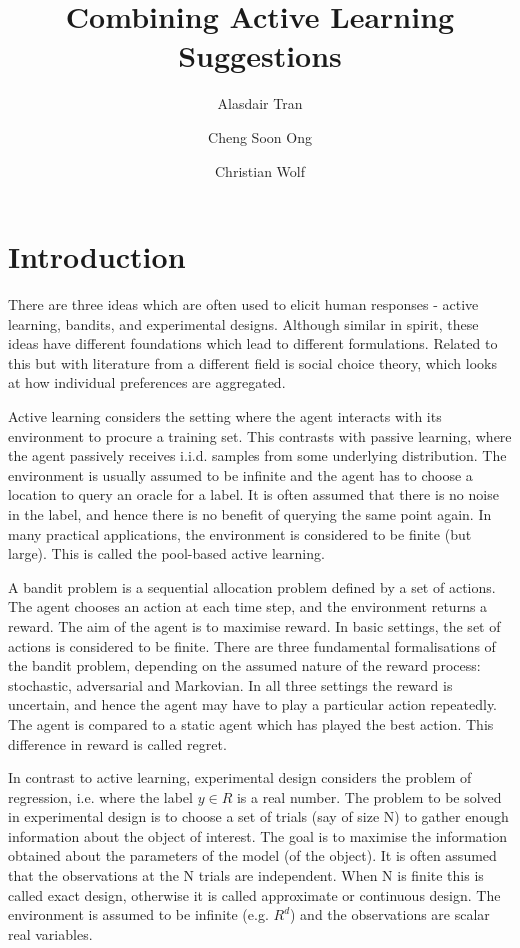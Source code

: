 \documentclass[fleqn,10pt,lineno]{wlpeerj} %
\title{Combining Active Learning Suggestions}
\author[1]{Alasdair Tran}
\author[2]{Cheng Soon Ong}
\author[3]{Christian Wolf}
\affil[1]{}
\affil[2]{Machine Learning Research Group, Data61, CSIRO, Australia}
\affil[3]{Research School of Astronomy and Astrophysics, Australian National University}
\begin{document}
\flushbottom
\maketitle
\thispagestyle{empty}

\section*{Introduction}

There are three ideas which are often used to elicit human responses - active
learning, bandits, and experimental designs. Although similar in spirit, these
ideas have different foundations which lead to different formulations. Related
to this but with literature from a different field is social choice theory,
which looks at how individual preferences are aggregated.

Active learning considers the setting where the agent interacts with its
environment to procure a training set. This contrasts with passive learning,
where the agent passively receives i.i.d. samples from some underlying
distribution. The environment is usually assumed to be infinite and the agent
has to choose a location to query an oracle for a label. It is often assumed
that there is no noise in the label, and hence there is no benefit of querying
the same point again. In many practical applications, the environment is
considered to be finite (but large). This is called the pool-based active
learning.

A bandit problem is a sequential allocation problem defined by a set of
actions. The agent chooses an action at each time step, and the environment
returns a reward. The aim of the agent is to maximise reward. In basic
settings, the set of actions is considered to be finite. There are three
fundamental formalisations of the bandit problem, depending on the assumed
nature of the reward process: stochastic, adversarial and Markovian. In all
three settings the reward is uncertain, and hence the agent may have to play a
particular action repeatedly. The agent is compared to a static agent which has
played the best action. This difference in reward is called regret.

In contrast to active learning, experimental design considers the problem of
regression, i.e. where the label $y\in R$ is a real number. The problem to be
solved in experimental design is to choose a set of trials (say of size N) to
gather enough information about the object of interest. The goal is to maximise
the information obtained about the parameters of the model (of the object). It
is often assumed that the observations at the N trials are independent. When N
is finite this is called exact design, otherwise it is called approximate or
continuous design. The environment is assumed to be infinite (e.g. $R^d$) and
the observations are scalar real variables.
\end{document}

